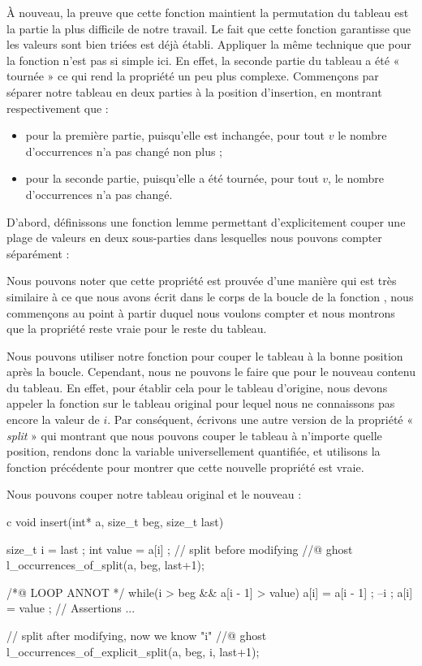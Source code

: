 À nouveau, la preuve que cette fonction maintient la permutation du tableau est
la partie la plus difficile de notre travail. Le fait que cette fonction
garantisse que les valeurs sont bien triées est déjà établi. Appliquer la
même technique que pour la fonction  n'est pas si
simple ici. En effet, la seconde partie du tableau a été « tournée » ce qui
rend la propriété un peu plus complexe. Commençons par séparer notre
tableau en deux parties à la position d'insertion, en montrant respectivement
que :
\begin{itemize}
    \item pour la première partie, puisqu'elle est inchangée, pour tout $v$
          le nombre d'occurrences n'a pas changé non plus ;
    \item pour la seconde partie, puisqu'elle a été tournée, pour tout $v$, le
          nombre d'occurrences n'a pas changé.
\end{itemize}


D'abord, définissons une fonction lemme permettant d'explicitement
couper une plage de valeurs en deux sous-parties dans lesquelles nous pouvons
compter séparément :




Nous pouvons noter que cette propriété est prouvée d'une manière qui est très
similaire à ce que nous avons écrit dans le corps de la boucle de la fonction
, nous commençons au point à partir duquel nous
voulons compter et nous montrons que la propriété reste vraie pour le reste
du tableau.


Nous pouvons utiliser notre fonction pour couper le tableau à la bonne position
après la boucle. Cependant, nous ne pouvons le faire que pour le nouveau contenu
du tableau. En effet, pour établir cela pour le tableau d'origine, nous devons
appeler la fonction sur le tableau original pour lequel nous ne connaissons pas
encore la valeur de $i$. Par conséquent, écrivons une autre version de la
propriété « \textit{split} » qui montrant que nous pouvons couper le tableau à
n'importe quelle position, rendons donc la variable 
universellement quantifiée, et utilisons la fonction précédente pour montrer que
cette nouvelle propriété est vraie.




Nous pouvons couper notre tableau original et le nouveau :


\begin{CodeBlock}{c}
void insert(int* a, size_t beg, size_t last){
  size_t i = last ;
  int value = a[i] ;
  // split before modifying
  //@ ghost l_occurrences_of_split(a, beg, last+1);

  /*@ LOOP ANNOT */
  while(i > beg && a[i - 1] > value){
    a[i] = a[i - 1] ;
    --i ;
  }
  a[i] = value ;
  // Assertions ...

  // split after modifying, now we know "i"
  //@ ghost l_occurrences_of_explicit_split(a, beg, i, last+1);
}
\end{CodeBlock}


